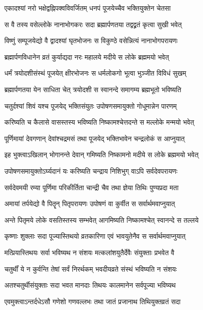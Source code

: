 \twolineshloka
{एकादश्यां नरो भक्षेद्वह्निपक्वविवर्जितम्}
{धनपं पूजयेच्चैव भक्तियुक्तेन चेतसा} %

\twolineshloka
{स वै तस्य वसेल्लोके नानाभोगकरः सदा}
{ब्रह्मार्पणतया तद्वद्व्रतं कृत्वा सुखी भवेत्} %

\twolineshloka
{विष्णुं सम्पूजयेद्यो वै द्वादश्यां घृतभोजनः}
{स विकुण्ठे वसेन्नित्यं नानाभोगपरायणः} %

\twolineshloka
{ब्रह्मार्पणविधानेन व्रतं कुर्याद्यदा नरः}
{महालये मदीये स लोके ब्रह्ममयो भवेत्} %

\twolineshloka
{धर्मं त्रयोदशीसंस्थं पूजयेत् क्षीरभोजनः}
{स धर्मलोकगो भूत्वा भुञ्जीत विविधं सुखम्} %

\twolineshloka
{ब्रह्मार्पणतया येन साधिता चेत् त्रयोदशी}
{स स्वानन्दे समागम्य ब्रह्मभूतो भविष्यति} %

\twolineshloka
{चतुर्दश्यां शिवं यश्च पूजयेद् भक्तिसंयुतः}
{उपोषणसमायुक्तो गोधूमान्नेन पारणम्} %

\twolineshloka
{करिष्यति च कैलासे वासस्तस्य भविष्यति}
{निष्कामश्चेत्तदन्ते स मल्लोके मन्मयो भवेत्} %

\twolineshloka
{पूर्णिमायां देवगणान् देवांश्चद्रमसं तथा}
{पूजयेद् भक्तिभावेन चन्द्रलोकं स आप्नुयात्} %

\twolineshloka
{इह भुक्त्वाऽखिलान् भोगानन्ते देवान् गमिष्यति}
{निष्कामनो मदीये स लोके ब्रह्ममयो भवेत्} %

\twolineshloka
{उपोषणसमायुक्तोऽर्घ्यदानं यः करिष्यति}
{चन्द्राय निशिभुग् वाऽपि सर्वदेवपरायणः} %

\twolineshloka
{सर्वदेवमयी रम्या पूर्णिमा परिकीर्तिता}
{चान्द्री चैव तथा ज्ञेया तिथिः पुण्यप्रदा मता} %

\twolineshloka
{अमायां तर्पयेद्यो वै पितॄन् पितृपरायणः}
{उपोषणं वा कुर्वीत स सर्वार्थमवाप्नुयात्} %

\twolineshloka
{अन्ते पितृमये लोके वसतिस्तस्य सम्भवेत्}
{आगमिष्यति निष्कामश्चेत् स्वानन्दे स तल्लये} %

\twolineshloka
{कृष्णाः शुक्लाः सदा पूज्यास्तिथयो व्रतकारिणा}
{एवं भावयुतेनैव स सर्वार्थमवाप्नुयात्} %

\twolineshloka
{मत्प्रियास्तिथयः सर्वा भविष्यथ न संशयः}
{मत्कलांशयुतैर्देवैः संयुक्ताः प्रभवेत वै} %

\twolineshloka
{चतुर्थीं ये न कुर्वन्ति तेषां सर्वं निरर्थकम्}
{भवदीयव्रते संस्थं भविष्यति न संशयः} %

\twolineshloka
{अतश्चतुर्थीसंयुक्ताः सदा भवत मानदाः}
{तिथयः कालमानेन सर्वपूज्या भविष्यथ} %

\twolineshloka
{एवमुक्त्वाऽन्तर्दधेऽसौ गणेशो गणवल्लभः}
{तथा जातं प्रजानाथ तिथियुक्तव्रतं सदा} %

